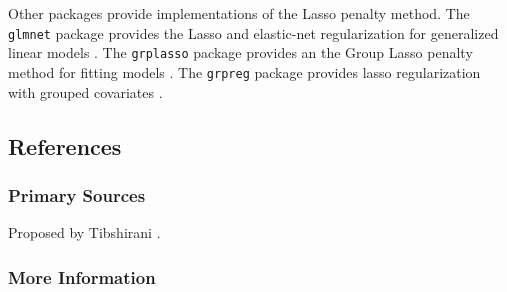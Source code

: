 


Other packages provide implementations of the Lasso penalty method.
The \texttt{glmnet} package provides the Lasso and elastic-net regularization for generalized linear models \cite{Friedman2011}.
The \texttt{grplasso} package provides an the Group Lasso penalty method for fitting models \cite{Meier2009}.
The \texttt{grpreg} package provides lasso regularization with grouped covariates \cite{Brehen2011}.


\subsection{References}

\subsubsection{Primary Sources}

Proposed by Tibshirani \cite{Tibshirani1996}.

\subsubsection{More Information}



